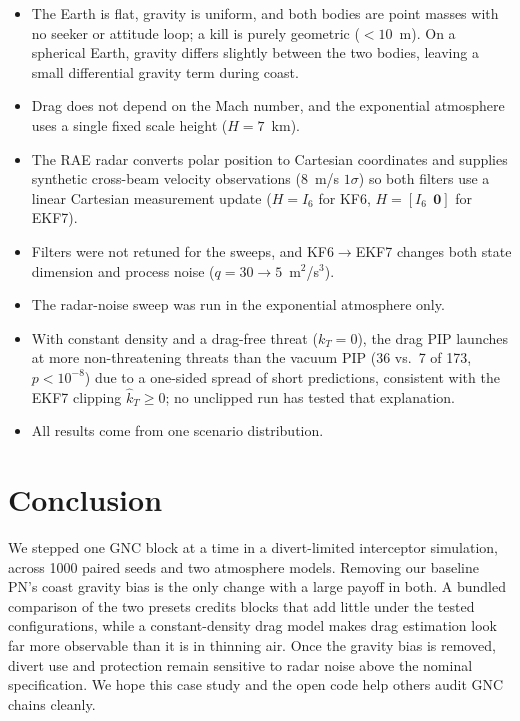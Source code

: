 \documentclass[conference,letterpaper]{IEEEtran}
\newcommand{\vect}[1]{\mathbf{#1}}
\begin{document}
\begin{itemize}
\item The Earth is flat, gravity is uniform, and both bodies are point masses with no seeker or attitude loop; a kill is purely geometric ($< 10$~m).
On a spherical Earth, gravity differs slightly between the two bodies, leaving a small differential gravity term during coast.
\item Drag does not depend on the Mach number, and the exponential atmosphere uses a single fixed scale height ($H = 7$~km).
\item The RAE radar converts polar position to Cartesian coordinates and supplies synthetic cross-beam velocity observations (8~m/s $1\sigma$) so both filters use a linear Cartesian measurement update ($H = I_6$ for KF6, $H = [I_6\;\,\vect 0]$ for EKF7).
\item Filters were not retuned for the sweeps, and KF6$\to$EKF7 changes both state dimension and process noise ($q = 30\to5$~m$^2$/s$^3$).
\item The radar-noise sweep was run in the exponential atmosphere only.
\item With constant density and a drag-free threat ($k_T = 0$), the drag PIP launches at more non-threatening threats than the vacuum PIP (36 vs.\ 7 of 173, $p < 10^{-8}$) due to a one-sided spread of short predictions, consistent with the EKF7 clipping $\hat k_T \ge 0$; no unclipped run has tested that explanation.
\item All results come from one scenario distribution.
\end{itemize}

\section{Conclusion}

We stepped one GNC block at a time in a divert-limited interceptor simulation, across 1000 paired seeds and two atmosphere models.
Removing our baseline PN's coast gravity bias is the only change with a large payoff in both.
A bundled comparison of the two presets credits blocks that add little under the tested configurations, while a constant-density drag model makes drag estimation look far more observable than it is in thinning air.
Once the gravity bias is removed, divert use and protection remain sensitive to radar noise above the nominal specification.
We hope this case study and the open code help others audit GNC chains cleanly.
\end{document}
